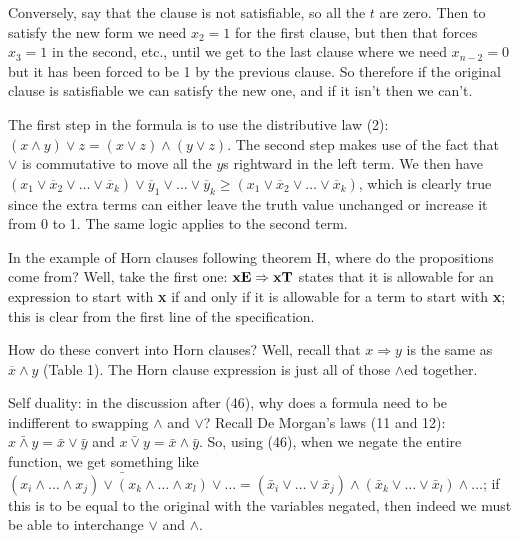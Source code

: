 Conversely, say that the clause is not satisfiable, so all the $t$
are zero.  Then to satisfy the new form we need $x_2 = 1$ for
the first clause, but then that forces $x_3 = 1$ in the second,
etc., until we get to the last clause where we need $x_{n-2} = 0$
but it has been forced to be 1 by the previous clause.  So therefore
if the original clause is satisfiable we can satisfy the new one, and
if it isn't then we can't.

\vskip0.1in \hfil\break

 \hfil\break
The first step in the formula is to use the 
distributive law (2): $\left(x \wedge y\right) \vee z = \left(x \vee z\right) 
\wedge \left(y \vee z\right)$.
The second step makes use of the fact that $\vee$ is commutative to move all the $y$s 
rightward in the left term.  We then have $\left(x_1 \vee \overline{x}_2
\vee \ldots \vee \overline{x}_k\right) \vee \overline{y}_1 \vee \ldots \vee 
\overline{y}_k
\geq \left(x_1 \vee \overline{x}_2 \vee \ldots \vee \overline{x}_k\right)$,
which is clearly true since the extra terms can either leave the truth value 
unchanged or increase it from 0 to 1.  The same logic applies to the second term.

\vskip0.05in \noindent [p58] In the example of Horn clauses following theorem H, where 
do the propositions come from? \hfil\break  
Well, take the first one: $\bf xE \Rightarrow xT$ states
that it is allowable for an expression to start with {\bf x} if and only if
it is allowable for a term to start with {\bf x}; this is clear from the first
line of the specification.  

How do these convert into Horn clauses?  Well, recall that $x \Rightarrow y$
is the same as $\overline{x} \wedge y$ (Table 1).  The Horn clause expression is
just all of those $\wedge$ed together.

\vskip0.1in 

\noindent [p63] Self duality: in the discussion after (46), why does a formula
need to be indifferent to swapping $\wedge$ and $\vee$?  Recall De Morgan's
laws (11 and 12): $\bar{x \wedge y} = \bar x \vee \bar y$ and $\bar{x \vee y} =
\bar x \wedge \bar y$.  So, using (46), when we negate the entire function,
we get something like $\bar{\left(x_i \wedge \ldots \wedge x_j\right) \vee
\left(x_k \wedge \ldots \wedge x_l\right) \vee \ldots} =
\left(\bar x_i \vee \ldots \vee \bar x_j\right) \wedge
\left(\bar x_k \vee \ldots \vee \bar x_l\right) \wedge \ldots$;
if this is to be equal to the original with the variables negated, then
indeed we must be able to interchange $\vee$ and $\wedge$.

